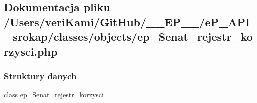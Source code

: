 \hypertarget{ep___senat__rejestr__korzysci_8php}{\subsection{Dokumentacja pliku /\-Users/veri\-Kami/\-Git\-Hub/\-\_\-\-\_\-\-E\-P\-\_\-\-\_\-/e\-P\-\_\-\-A\-P\-I\-\_\-srokap/classes/objects/ep\-\_\-\-Senat\-\_\-rejestr\-\_\-korzysci.php}
\label{ep___senat__rejestr__korzysci_8php}
}
\subsubsection*{Struktury danych}
\begin{DoxyCompactItemize}
\item 
class \hyperlink{classep___senat__rejestr__korzysci}{ep\-\_\-\-Senat\-\_\-rejestr\-\_\-korzysci}
\end{DoxyCompactItemize}
